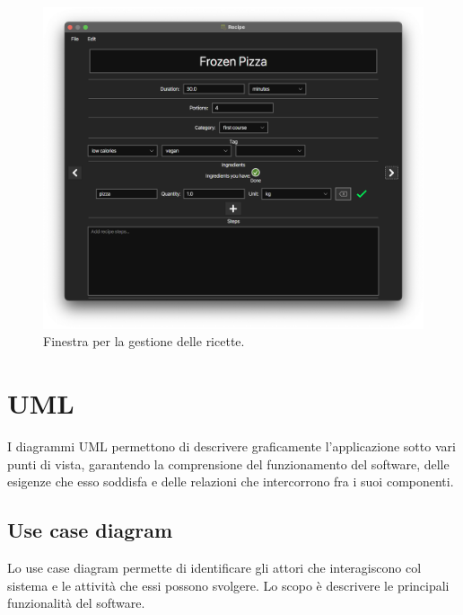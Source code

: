 \documentclass{article}
\begin{document}
\begin{figure}[H]
    \includegraphics[width=\linewidth]{images/recipe-view.png}
    \caption{Finestra per la gestione delle ricette.}
    \label{fig:recipeview}
\end{figure}

\section{UML}

I diagrammi UML permettono di descrivere graficamente l'applicazione sotto vari punti di vista, garantendo la comprensione del funzionamento del software, delle esigenze che esso soddisfa e delle relazioni che intercorrono fra i suoi componenti.

\subsection{Use case diagram}

Lo use case diagram permette di identificare gli attori che interagiscono col sistema e le attività che essi possono svolgere. Lo scopo è descrivere le principali funzionalità del software.
\end{document}
